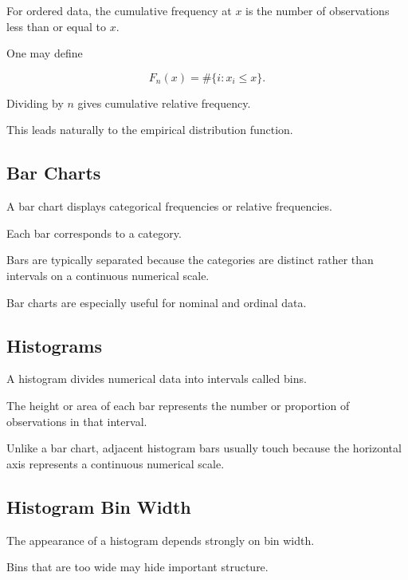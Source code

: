 For ordered data, the cumulative frequency at \(x\) is the number of
observations less than or equal to \(x\).

One may define

\[
\boxed{
F_n(x)
=
\#\{i:x_i\leq x\}.
}
\]

Dividing by \(n\) gives cumulative relative frequency.

This leads naturally to the empirical distribution function.

\subsection{Bar Charts}
\label{subsec:bar-charts}

A bar chart displays categorical frequencies or relative frequencies.

Each bar corresponds to a category.

Bars are typically separated because the categories are distinct rather
than intervals on a continuous numerical scale.

Bar charts are especially useful for nominal and ordinal data.

\subsection{Histograms}
\label{subsec:histograms}

A histogram divides numerical data into intervals called bins.

The height or area of each bar represents the number or proportion of
observations in that interval.

Unlike a bar chart, adjacent histogram bars usually touch because the
horizontal axis represents a continuous numerical scale.

\subsection{Histogram Bin Width}
\label{subsec:histogram-bin-width}

The appearance of a histogram depends strongly on bin width.

Bins that are too wide may hide important structure.

